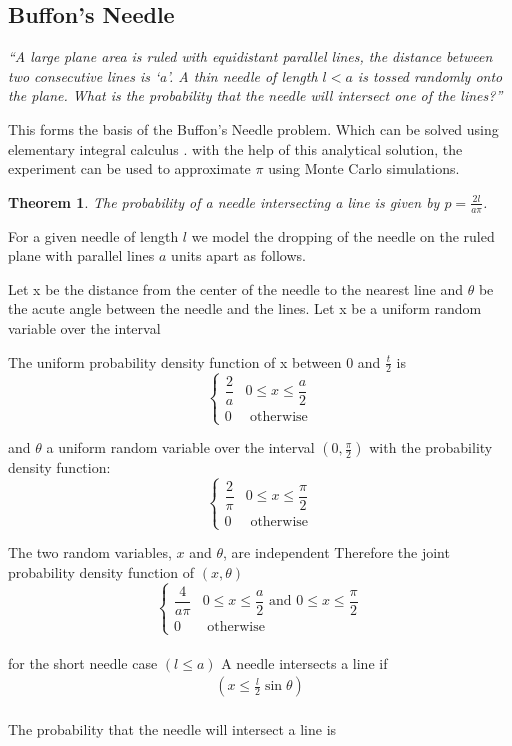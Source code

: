 \documentclass[12pt]{article}
\numberwithin{equation}{section}
\newtheorem{theorem}{Theorem}[section]
\begin{document}
\subsection{Buffon's Needle}
 \textit{``A large plane area is ruled with equidistant parallel lines, the distance between two consecutive lines is `a'. A thin needle of length $l< a$ is tossed randomly onto the plane. What is the probability that the needle will intersect one of the lines?''}\par
 This forms the basis of the Buffon’s Needle problem. Which can be solved using elementary integral calculus \cite{needlewang}. with the help of this analytical solution, the experiment can be used to approximate $\pi$ using Monte Carlo simulations.
\begin{theorem}
The probability of a needle intersecting a line is given by $p=\frac{2l}{a \pi}$.
\end{theorem}
 For a given needle of length $l$ we model the dropping of the needle on the ruled plane with parallel lines $a$ units apart as follows. \par
 Let x be the distance from the center of the needle to the nearest line and $\theta$ be the acute angle between the needle and the lines. Let x be a uniform random variable over the interval
\par
The uniform probability density function of x between 0 and $ \frac{t}{2}$ is
\[
\begin{cases}
   \dfrac{2}{a} & 0 \leqslant x\leqslant \dfrac{a}{2}\\
  0 & \text {   otherwise}
\end{cases}
\]
\par
and $\theta$ a uniform random variable over the interval $\left(0, \frac{\pi}{2}\right)$ with the probability density function:\\
\[
\begin{cases}
    \dfrac{2}{\pi} & 0 \leqslant x\leqslant \dfrac{\pi}{2}\\
    0 & \text {   otherwise}
\end{cases}
\]
\par
The two random variables, $x$ and $\theta$, are independent  Therefore the joint probability density function of
$(x,\theta)$ 
\[
\begin{cases}
    \dfrac{4}{a\pi} &  0 \leqslant x\leqslant \dfrac{a}{2} \text{ and } 0 \leqslant x\leqslant \dfrac{\pi}{2}\\
0  &  \text {   otherwise}
\end{cases}\]
\\ for the short needle case $\left( l \leqslant a \right)$  A needle
intersects a line if
\begin{align*}
    \left( x \leqslant \frac{l}{2}\sin \theta \right )
\end{align*}
\\
The probability that the needle will intersect a line is
\end{document}

